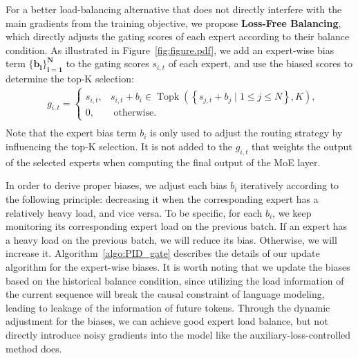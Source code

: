 \documentclass{article} %
\newcommand{\ours}{Loss-Free Balancing}
\begin{document}
For a better load-balancing alternative that does not directly interfere with the main gradients from the training objective, we propose \textbf{\ours{}}, which directly adjusts the gating scores of each expert according to their balance condition. 
As illustrated in Figure~\ref{fig:figure.pdf}, we add an expert-wise bias term $\boldsymbol{\{b_i\}_{i=1}^N}$ to the gating scores $s_{i,t}$ of each expert, and use the biased scores to determine the top-K selection:
\begin{equation}
\label{eq:PID_gate}
\begin{aligned}
& g_{i, t}= \begin{cases}s_{i, t}, & s_{i, t} + b_i \in \operatorname{Topk}\left(\left\{s_{j, t} + b_j\mid 1 \leq j \leq N\right\}, K\right), \\
0, & \text { otherwise. }\end{cases} \\
\end{aligned} 
\end{equation}
Note that the expert bias term $b_i$ is only used to adjust the routing strategy by influencing the top-K selection. 
It is not added to the $g_{i,t}$ that weights the output of the selected experts when computing the final output of the MoE layer.

In order to derive proper biases, we adjust each bias $b_i$ iteratively according to the following principle: decreasing it when the corresponding expert has a relatively heavy load, and vice versa. 
To be specific, for each ${b}_i$, we keep monitoring its corresponding expert load on the previous batch. 
If an expert has a heavy load on the previous batch, we will reduce its bias. 
Otherwise, we will increase it. 
Algorithm~\ref{algo:PID_gate} describes the details of our update algorithm for the expert-wise biases.
It is worth noting that we update the biases based on the historical balance condition, since utilizing the load information of the current sequence will break the causal constraint of language modeling, leading to leakage of the information of future tokens. 
Through the dynamic adjustment for the biases, we can achieve good expert load balance, but not directly introduce noisy gradients into the model like the auxiliary-loss-controlled method does. 
\end{document}
